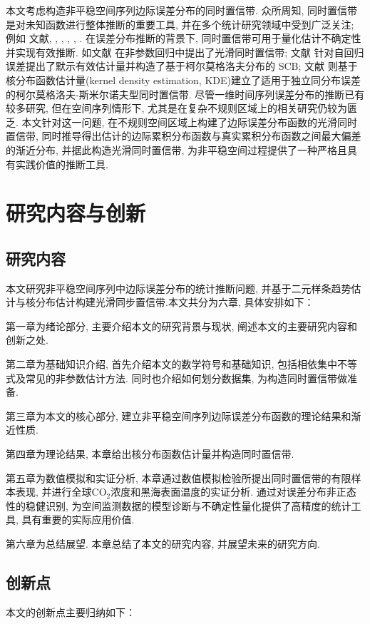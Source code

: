 \documentclass[a4paper,openay,14pt]{ctexbook}
\numberwithin{equation}{section}
\numberwithin{lem}{section}
\begin{document}
本文考虑构造非平稳空间序列边际误差分布的同时置信带. 众所周知, 同时置信带是对未知函数进行整体推断的重要工具, 并在多个统计研究领域中受到广泛关注; 例如
文献\cite{wang2013smooth}, \cite{gu2014simultaneous}, \cite{wang2014oracally}, \cite{cao2016oracle}, \cite{zhang2018smooth}, \cite{wang2022oracle}.
在误差分布推断的背景下, 同时置信带可用于量化估计不确定性并实现有效推断. 如文献\cite{gu2021smooth} 在非参数回归中提出了光滑同时置信带; 文献\cite{wang2014oracally} 针对自回归误差提出了默示有效估计量并构造了基于柯尔莫格洛夫分布的 SCB; 文献\cite{wang2022oracle} 则基于核分布函数估计量(kernel density estimation, KDE)建立了适用于独立同分布误差的柯尔莫格洛夫-斯米尔诺夫型同时置信带. 尽管一维时间序列误差分布的推断已有较多研究, 但在空间序列情形下, 尤其是在复杂不规则区域上的相关研究仍较为匮乏. 本文针对这一问题, 在不规则空间区域上构建了边际误差分布函数的光滑同时置信带, 同时推导得出估计的边际累积分布函数与真实累积分布函数之间最大偏差的渐近分布, 并据此构造光滑同时置信带, 为非平稳空间过程提供了一种严格且具有实践价值的推断工具.


\section{研究内容与创新}
\subsection{研究内容}
本文研究非平稳空间序列中边际误差分布的统计推断问题,  并基于二元样条趋势估计与核分布估计构建光滑同步置信带.本文共分为六章, 具体安排如下：

第一章为绪论部分,  主要介绍本文的研究背景与现状,  阐述本文的主要研究内容和创新之处. 

第二章为基础知识介绍,  首先介绍本文的数学符号和基础知识, 包括相依集中不等式及常见的非参数估计方法. 同时也介绍如何划分数据集, 为构造同时置信带做准备. 

第三章为本文的核心部分,   建立非平稳空间序列边际误差分布函数的理论结果和渐近性质.

第四章为理论结果, 本章给出核分布函数估计量并构造同时置信带. 

第五章为数值模拟和实证分析, 本章通过数值模拟检验所提出同时置信带的有限样本表现, 并进行全球CO$_2$浓度和黑海表面温度的实证分析. 通过对误差分布非正态性的稳健识别, 为空间监测数据的模型诊断与不确定性量化提供了高精度的统计工具, 具有重要的实际应用价值. 

第六章为总结展望. 本章总结了本文的研究内容,  并展望未来的研究方向. 

\subsection{创新点}
本文的创新点主要归纳如下：
\end{document}
